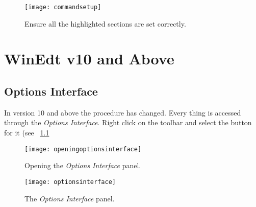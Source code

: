 \documentclass{lebook}
\begin{document}
    \begin{figure}
        \centering
        \texttt{[image: commandsetup]}
        \caption{Ensure all the highlighted sections are set correctly.}
        \label{fig:commandsetup}
    \end{figure}


    \chapter{WinEdt v10 and Above}
    \section{Options Interface}
In version 10 and above the procedure has changed.  Every thing is accessed through the \textit{Options Interface}.  Right click on the toolbar and select the button for it (see \figurename~\ref{}
    \begin{figure}
      \centering
      \texttt{[image: openingoptionsinterface]}
      \caption{Opening the \textit{Options Interface} panel.}
      \label{fig:openingoptionsinterface}
    \end{figure}

    \begin{figure}
      \centering
      \texttt{[image: optionsinterface]}
      \caption{The \textit{Options Interface} panel.}
      \label{fig:optionsinterface}
    \end{figure}
\end{document}
